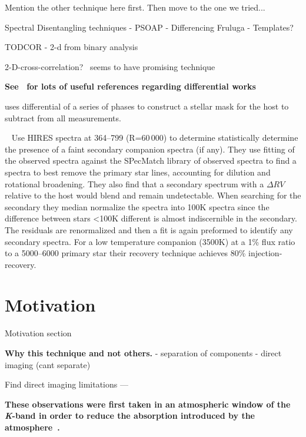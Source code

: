 Mention the other technique here first.
Then move to the one we tried...




Spectral Disentangling techniques
- PSOAP
- Differencing Fruluga
- Templates?

TODCOR - 2-d from binary analysis~\citep{zucker_study_1994}
\citep{mazeh_detecting_1997}

2-D-cross-correlation?~\citet{piskorz_evidence_2016} seems to have promising technique


\textbf{
See~\citet{kostogryz_spectral_2013} for lots of useful references regarding differential works~\citet{simon_disentangling_1994}}

\citet{rodler_weighing_2012} uses differential of a series of phases to construct a stellar mask for the host to subtract from all measurements.



{\red{}~\citet{kolbl_detection_2015} Use HIRES spectra at 364--799\nm{} (R=60\,000) to determine statistically determine the presence of a faint secondary companion spectra (if any).
They use \textchisquared fitting of the observed spectra against the {SPecMatch} library of observed spectra to find a spectra to best remove the primary star lines,
accounting for dilution and rotational broadening.
They also find that a secondary spectrum with a $\Delta RV$ relative to the host would blend and remain undetectable.
When searching for the secondary they median normalize the spectra into 100K spectra since the difference between stars  <100K different is almost indiscernible in the secondary. The residuals are renormalized and then a \textchisquared fit is again preformed to identify any secondary spectra.
For a low temperature companion (3500K) at a 1\% flux ratio to a 5000--6000\K{} primary star their recovery technique achieves 80\% injection-recovery.}



\section{Motivation}

Motivation section

\textbf{Why this technique and not others.}
- separation of components
- direct imaging (cant separate)


Find direct imaging limitations ---



\textbf{These observations were first taken in an atmospheric window of the \emph{K}-band in order to reduce the absorption introduced by the atmosphere~\citep{barnes_hd_2008}.
}

